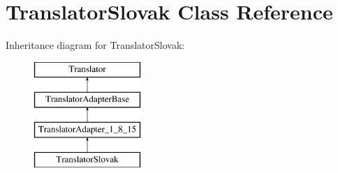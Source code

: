 \hypertarget{class_translator_slovak}{}\section{Translator\+Slovak Class Reference}
\label{class_translator_slovak}
Inheritance diagram for Translator\+Slovak\+:\begin{figure}[H]
\begin{center}
\leavevmode
\includegraphics[height=4.000000cm]{class_translator_slovak}
\end{center}
\end{figure}
